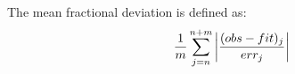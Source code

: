 The mean fractional deviation is defined as:
$${1\over m}\sum_{j=n}^{n+m} \left|{(obs-fit)_j\over err_j}\right|$$


